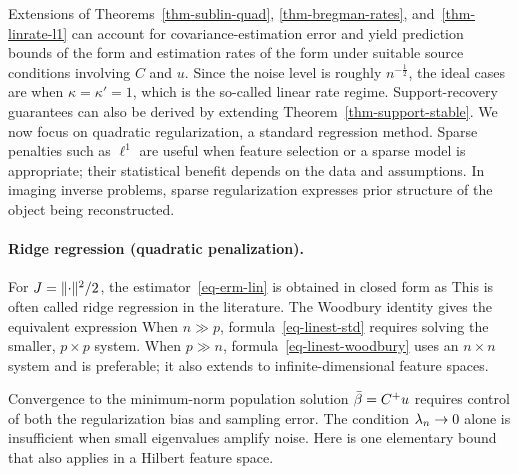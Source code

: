 Extensions of Theorems~\ref{thm-sublin-quad}, \ref{thm-bregman-rates}, and~\ref{thm-linrate-l1} can account for covariance-estimation error and yield prediction bounds of the form
and estimation rates of the form 
under suitable source conditions involving $C$ and $u$.
%
Since the noise level is roughly $n^{-\frac{1}{2}}$, the ideal cases are when $\kappa=\kappa'=1$, which is the so-called linear rate regime.  
%
Support-recovery guarantees can also be derived by extending Theorem~\ref{thm-support-stable}. We now focus on quadratic regularization, a standard regression method. Sparse penalties such as $\ell^1$ are useful when feature selection or a sparse model is appropriate; their statistical benefit depends on the data and assumptions.
%
In imaging inverse problems, sparse regularization expresses prior structure of the object being reconstructed.

\paragraph{Ridge regression (quadratic penalization).}

For $J=\lVert\cdot\rVert^2/2$, the estimator~\eqref{eq-erm-lin} is obtained in closed form as
This is often called ridge regression in the literature.
%
The Woodbury identity gives the equivalent expression
When $n\gg p$, formula~\eqref{eq-linest-std} requires solving the smaller, $p\times p$ system. When $p\gg n$, formula~\eqref{eq-linest-woodbury} uses an $n\times n$ system and is preferable; it also extends to infinite-dimensional feature spaces.

Convergence to the minimum-norm population solution $\bar{\beta}=C^+u$ requires control of both the regularization bias and sampling error. The condition $\lambda_n\to0$ alone is insufficient when small eigenvalues amplify noise. Here is one elementary bound that also applies in a Hilbert feature space.

